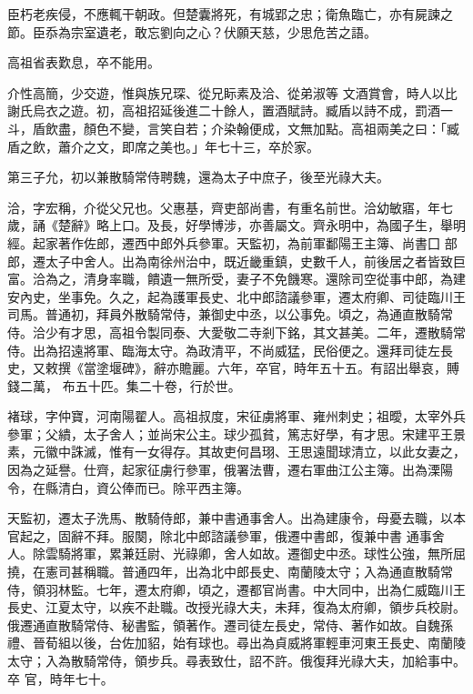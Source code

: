 \begin{pinyinscope}
 臣朽老疾侵，不應輒干朝政。但楚囊將死，有城郢之忠；衛魚臨亡，亦有屍諫之節。臣忝為宗室遺老，敢忘劉向之心？伏願天慈，少思危苦之語。



 高祖省表歎息，卒不能用。



 介性高簡，少交遊，惟與族兄琛、從兄眎素及洽、從弟淑等
 文酒賞會，時人以比謝氏烏衣之遊。初，高祖招延後進二十餘人，置酒賦詩。臧盾以詩不成，罰酒一斗，盾飲盡，顏色不變，言笑自若；介染翰便成，文無加點。高祖兩美之曰：「臧盾之飲，蕭介之文，即席之美也。」年七十三，卒於家。



 第三子允，初以兼散騎常侍聘魏，還為太子中庶子，後至光祿大夫。



 洽，字宏稱，介從父兄也。父惠基，齊吏部尚書，有重名前世。洽幼敏寤，年七歲，誦《楚辭》略上口。及長，好學博涉，亦善屬文。齊永明中，為國子生，舉明經。起家著作佐郎，遷西中郎外兵參軍。天監初，為前軍鄱陽王主簿、尚書囗
 部郎，遷太子中舍人。出為南徐州治中，既近畿重鎮，史數千人，前後居之者皆致巨富。洽為之，清身率職，饋遺一無所受，妻子不免饑寒。還除司空從事中郎，為建安內史，坐事免。久之，起為護軍長史、北中郎諮議參軍，遷太府卿、司徒臨川王司馬。普通初，拜員外散騎常侍，兼御史中丞，以公事免。頃之，為通直散騎常侍。洽少有才思，高祖令製同泰、大愛敬二寺剎下銘，其文甚美。二年，遷散騎常侍。出為招遠將軍、臨海太守。為政清平，不尚威猛，民俗便之。還拜司徒左長史，又敕撰《當塗堰碑》，辭亦贍麗。六年，卒官，時年五十五。有詔出舉哀，賻錢二萬，
 布五十匹。集二十卷，行於世。



 褚球，字仲寶，河南陽翟人。高祖叔度，宋征虜將軍、雍州刺史；祖曖，太宰外兵參軍；父繢，太子舍人；並尚宋公主。球少孤貧，篤志好學，有才思。宋建平王景素，元徽中誅滅，惟有一女得存。其故吏何昌珝、王思遠聞球清立，以此女妻之，因為之延譽。仕齊，起家征虜行參軍，俄署法曹，遷右軍曲江公主簿。出為溧陽令，在縣清白，資公俸而已。除平西主簿。



 天監初，遷太子洗馬、散騎侍郎，兼中書通事舍人。出為建康令，母憂去職，以本官起之，固辭不拜。服闋，除北中郎諮議參軍，俄遷中書郎，復兼中書
 通事舍人。除雲騎將軍，累兼廷尉、光祿卿，舍人如故。遷御史中丞。球性公強，無所屈撓，在憲司甚稱職。普通四年，出為北中郎長史、南蘭陵太守；入為通直散騎常侍，領羽林監。七年，遷太府卿，頃之，遷都官尚書。中大同中，出為仁威臨川王長史、江夏太守，以疾不赴職。改授光祿大夫，未拜，復為太府卿，領步兵校尉。俄遷通直散騎常侍、秘書監，領著作。遷司徒左長史，常侍、著作如故。自魏孫禮、晉荀組以後，台佐加貂，始有球也。尋出為貞威將軍輕車河東王長史、南蘭陵太守；入為散騎常侍，領步兵。尋表致仕，詔不許。俄復拜光祿大夫，加給事中。卒
 官，時年七十。




\end{pinyinscope}
